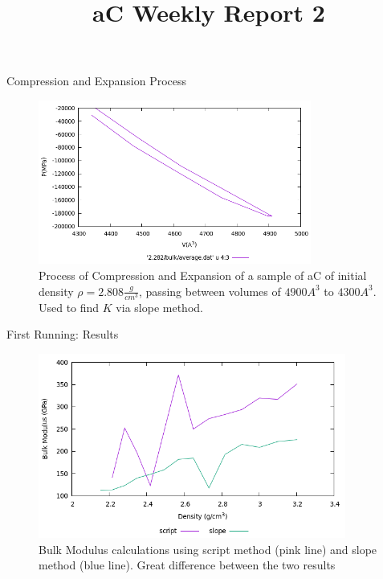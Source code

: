 \documentclass[11pt]{beamer}
\begin{document}
\begin{frame}{Compression and Expansion Process}
\begin{figure}
 \centering
    \includegraphics[width=0.8\textwidth]{plot-bulk.png}
 \caption{Process of Compression and Expansion of a sample of aC of initial density $\rho=2.808\frac{g}{cm^3}$, passing between volumes of $4900 A^3$ to $4300 A^3$. Used to find $K$ via slope method.}
\end{figure}
\end{frame}
\begin{frame}{First Running: Results}
\begin{figure}
 \centering
    \includegraphics[width=0.9\textwidth]{plot-yeah.png}
 \caption{Bulk Modulus calculations using script method (pink line) and slope method (blue line). Great difference between the two results}
\end{figure}
\end{frame}
\title[aC-WR2]{aC Weekly Report 2} 
\begin{frame}
\titlepage 
\end{frame}
\end{document}
